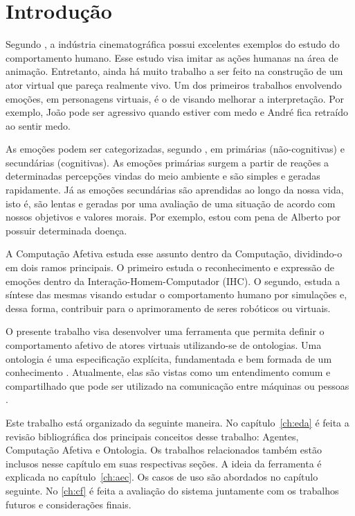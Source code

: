 \chapter{Introdução}

Segundo \citet{terzopoulos1998behavioral}, a indústria cinematográfica possui
excelentes exemplos do estudo do comportamento humano. Esse estudo visa imitar
as ações humanas na área de animação. Entretanto, ainda há muito trabalho a
ser feito na construção de um ator virtual que pareça realmente vivo. Um dos
primeiros trabalhos envolvendo emoções, em personagens virtuais, é o de
\citet{bates1994role} visando melhorar a interpretação. Por exemplo, João pode
ser agressivo quando estiver com medo e André fica retraído ao sentir medo.

As emoções podem ser categorizadas, segundo \citet{damasio2004erro}, em
primárias (não-cognitivas) e secundárias (cognitivas). As emoções primárias
surgem a partir de reações a determinadas percepções vindas do meio ambiente e
são simples e geradas rapidamente. Já as emoções secundárias são aprendidas ao
longo da nossa vida, isto é, são lentas e geradas por uma avaliação de uma
situação de acordo com nossos objetivos e valores morais. Por exemplo, estou
com pena de Alberto por possuir determinada doença.

A Computação Afetiva estuda esse assunto dentro da Computação, dividindo-o em
dois ramos principais. O primeiro estuda o reconhecimento e expressão de
emoções dentro da Interação-Homem-Computador (IHC). O segundo, estuda a
síntese das mesmas visando estudar o comportamento humano por simulações e,
dessa forma, contribuir para o aprimoramento de seres robóticos ou virtuais.

O presente trabalho visa desenvolver uma ferramenta que permita definir o
comportamento afetivo de atores virtuais utilizando-se de ontologias. Uma
ontologia é uma especificação explícita, fundamentada e bem formada de um
conhecimento \cite{gruber1993translation}. Atualmente, elas são vistas como um
entendimento comum e compartilhado que pode ser utilizado na comunicação entre
máquinas ou pessoas \cite{wks2008towards}.

Este trabalho está organizado da seguinte maneira. No capítulo~\ref{ch:eda}
é feita a revisão bibliográfica dos principais conceitos desse trabalho:
Agentes, Computação Afetiva e Ontologia. Os trabalhos relacionados também
estão inclusos nesse capítulo em suas respectivas seções. A ideia da
ferramenta é explicada no capítulo~\ref{ch:aec}. Os casos de uso são abordados no
capítulo seguinte. No \ref{ch:cf} é feita a avaliação do sistema juntamente
com os trabalhos futuros e considerações finais.

